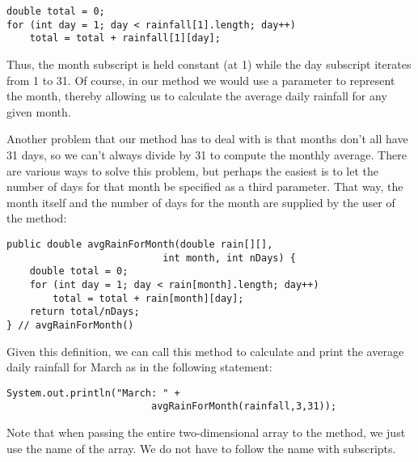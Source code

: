 \begin{jjjlisting}
\begin{lstlisting}
double total = 0;
for (int day = 1; day < rainfall[1].length; day++)
    total = total + rainfall[1][day];
\end{lstlisting}
\end{jjjlisting}

\noindent Thus, the month subscript is held constant (at 1)
while the day subscript iterates from 1 to 31. Of course,
in our method we would use a parameter to represent the month,
thereby allowing us to calculate the average daily rainfall for any
given month.


Another problem that our method has to deal with is that months don't
all have 31 days, so we can't always divide by 31 to compute the
monthly average.  There are various ways to solve this problem, but
perhaps the easiest is to let the number of days for that month be
specified as a third parameter.  That way, the month itself and the
number of days for the month are supplied by the user of the method:

\begin{jjjlisting}
\begin{lstlisting}
public double avgRainForMonth(double rain[][], 
                           int month, int nDays) {
    double total = 0;
    for (int day = 1; day < rain[month].length; day++)
        total = total + rain[month][day];
    return total/nDays;
} // avgRainForMonth()
\end{lstlisting}
\end{jjjlisting}

\noindent Given this definition, we can call this method to
calculate and print the average daily rainfall for March as in 
the following statement:

\begin{jjjlisting}
\begin{lstlisting}
System.out.println("March: " + 
                         avgRainForMonth(rainfall,3,31));
\end{lstlisting}
\end{jjjlisting}

\noindent Note that when passing the entire two-dimensional array to
the method, we just use the name of the array.  We do not have to
follow the name with \mbox{subscripts.}

